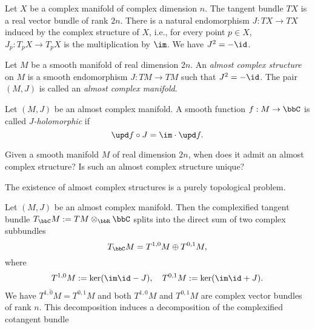     Let \(X\) be a complex manifold of complex dimension \(n\).
    The tangent bundle \(TX\) is a real vector bundle of rank \(2n\).
    There is a natural endomorphism \(J: TX\to TX\) induced by the complex structure of \(X\), i.e., for every point \(p\in X\), \(J_p: T_pX\to T_pX\) is the multiplication by \(\im\).
    We have \(J^2 = -\id\).

    \begin{definition}\label{def:almost_complex_structure}
        Let \(M\) be a smooth manifold of real dimension \(2n\).
        An \emph{almost complex structure} on \(M\) is a smooth endomorphism \(J: TM\to TM\) such that \(J^2 = -\id\).
        The pair \((M,J)\) is called an \emph{almost complex manifold}.
    \end{definition}

    \begin{definition}\label{def:J_holomorphic_function}
        Let \((M,J)\) be an almost complex manifold.
        A smooth function \(f: M\to \bbC\) is called \emph{\(J\)-holomorphic} if
        \[ \upd f \circ J = \im \cdot \upd f. \]
    \end{definition}

    \begin{question}\label{qs:existence_of_almost_complex_structure}
        Given a smooth manifold \(M\) of real dimension \(2n\), when does it admit an almost complex structure?
        Is such an almost complex structure unique?
    \end{question}

    The existence of almost complex structures is a purely topological problem.


    Let \((M,J)\) be an almost complex manifold.
    Then the complexified tangent bundle \(T_\bbC M := TM \otimes_\bbR \bbC\) splits into the direct sum of two complex subbundles
    \[ T_\bbC M = T^{1,0}M \oplus T^{0,1}M, \]
    where 
    \[ T^{1,0}M := \ker (\im \id - J), \quad T^{0,1}M := \ker (\im \id + J). \]
    We have \(\overline{T^{1,0}M} = T^{0,1}M\) and both \(T^{1,0}M\) and \(T^{0,1}M\) are complex vector bundles of rank \(n\).
    This decomposition induces a decomposition of the complexified cotangent bundle


